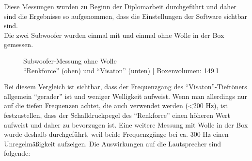 \newpage
Diese Messungen wurden zu Beginn der Diplomarbeit durchgeführt und daher sind die Ergebnisse so aufgenommen, dass die Einstellungen der Software sichtbar sind.\\ %
Die zwei Subwoofer wurden einmal mit und einmal ohne Wolle in der Box gemessen. 
\begin{figure} [H]
	\centering
	\quad
	\caption{Subwoofer-Messung ohne Wolle\\ \enquote{Renkforce} (oben) und \enquote{Visaton} (unten) | Boxenvolumen: 149 l}
	\label{fig:5.3.3.2}
\end{figure}
Bei diesem Vergleich ist sichtbar, dass der Frequenzgang des \enquote{Visaton}-Tieftöners allgemein \enquote{gerader} ist und weniger Welligkeit aufweist.
Wenn man allerdings nur auf die tiefen Frequenzen achtet, die auch verwendet werden (<200 Hz), ist festzustellen, dass der Schalldruckpegel des \enquote{Renkforce} einen höheren Wert aufweist und daher zu bevorzugen ist.\newpage
Eine weitere Messung mit Wolle in der Box wurde deshalb durchgeführt, weil beide Frequenzgänge bei ca. 300 Hz einen Unregelmäßigkeit aufzeigen.
Die Auswirkungen auf die Lautsprecher sind folgende:
